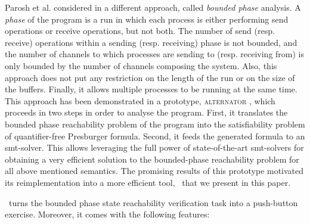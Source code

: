 Parosh et al. considered in \cite{AAC13} a different approach, called \textit{bounded phase} analysis.
%
A \textit{phase} of the program is a run in which each process 
is either performing send operations or receive operations, but not both.
%
The number of send (resp. receive) operations within a sending (resp. receiving) phase
is not bounded, and the number of channels to which processes are sending to (resp. receiving from)
is only bounded by the number of channels composing the system.
%
Also, this approach does not put any restriction on the length of the
run or on the size of the buffers.
%
Finally, it allows multiple processes to be running at the same time.
This approach has been demonstrated in a prototype, \textsc{alternator} \cite{github.alternator},
which proceeds in two steps in order to analyse the program.
%
First, it translates the bounded phase reachability problem of the program into the satisfiability problem of quantifier-free Presburger formula.
Second, it feeds the generated formula to an {\sc smt}-solver.
%
This allows leveraging the full power of state-of-the-art
{\sc smt}-solvers for obtaining a very efficient solution to the bounded-phase reachability problem for all above mentioned semantics. 
%
%
The promising results of this prototype motivated its reimplementation into a more efficient tool, \MPass\, that we present in this paper.

\MPass\ turns the bounded phase state reachability verification task into a push-button exercise.
Moreover, it comes with the following features:

